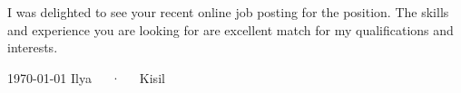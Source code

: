 \documentclass[11pt, a4paper]{ilyakisil-cv}
\begin{document}
\makecvheader[R]


\makelettertitle


\begin{cvletter}

    \lorem


    \lorem

    I was delighted to see your recent online job posting for the \fillme position. The skills and experience you are looking for are excellent match for my qualifications and interests.

    \begin{lettermatchitems}
                        {%
                            \lorem
                        }
                        {%
                            \lorem
                        }
    \end{lettermatchitems}

\end{cvletter}


\makeletterclosing

\makecvfooter
  {\today}
  {Ilya~~~·~~~Kisil}
  {}
\end{document}
